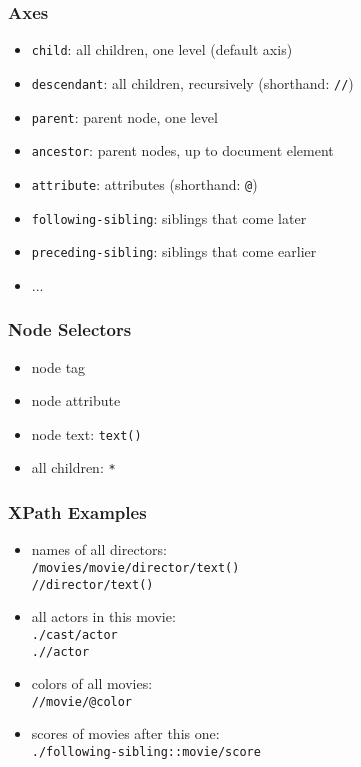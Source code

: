 \documentclass[dvipsnames]{beamer}
\theoremstyle{plain}
\begin{document}
\begin{frame}
  \frametitle{Axes}

  \begin{itemize}
    \item \lstinline!child!:
      all children, one level (default axis)
    \item \lstinline!descendant!:
      all children, recursively (shorthand: \lstinline!//!)
    \item \lstinline!parent!:
      parent node, one level
    \item \lstinline!ancestor!:
      parent nodes, up to document element
    \item \lstinline!attribute!:
      attributes (shorthand: \lstinline!@!)
    \item \lstinline!following-sibling!:
      siblings that come later
    \item \lstinline!preceding-sibling!:
      siblings that come earlier
    \item ...
  \end{itemize}
\end{frame}

\begin{frame}
  \frametitle{Node Selectors}

  \begin{itemize}
    \item node tag
    \item node attribute
    \item node text: \lstinline!text()!
    \item all children: \lstinline!*!
  \end{itemize}
\end{frame}

\begin{frame}
  \frametitle{XPath Examples}

  \begin{example}
    \begin{itemize}
      \item names of all directors:\\
        \lstinline!/movies/movie/director/text()!\\
        \lstinline!//director/text()!

      \pause
      \item all actors in this movie:\\
        \lstinline!./cast/actor!\\
        \lstinline!.//actor!

      \pause
      \item colors of all movies:\\
        \lstinline!//movie/@color!

      \pause
      \item scores of movies after this one:\\
        \lstinline!./following-sibling::movie/score!
    \end{itemize}
  \end{example}
\end{frame}
\end{document}
